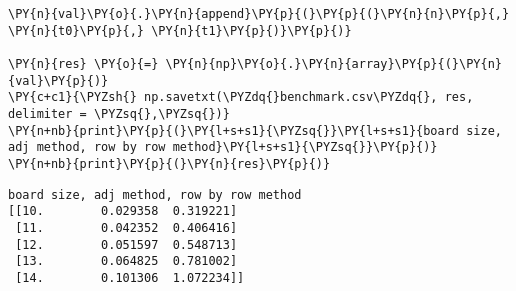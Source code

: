 \begin{english}
\begin{tcolorbox}[breakable, size=fbox, boxrule=1pt, pad at break*=1mm,colback=cellbackground, colframe=cellborder]
\begin{Verbatim}[commandchars=\\\{\}]
    \PY{n}{val}\PY{o}{.}\PY{n}{append}\PY{p}{(}\PY{p}{(}\PY{n}{n}\PY{p}{,} \PY{n}{t0}\PY{p}{,} \PY{n}{t1}\PY{p}{)}\PY{p}{)}

\PY{n}{res} \PY{o}{=} \PY{n}{np}\PY{o}{.}\PY{n}{array}\PY{p}{(}\PY{n}{val}\PY{p}{)}
\PY{c+c1}{\PYZsh{} np.savetxt(\PYZdq{}benchmark.csv\PYZdq{}, res, delimiter = \PYZsq{},\PYZsq{})}
\PY{n+nb}{print}\PY{p}{(}\PY{l+s+s1}{\PYZsq{}}\PY{l+s+s1}{board size, adj method, row by row method}\PY{l+s+s1}{\PYZsq{}}\PY{p}{)}
\PY{n+nb}{print}\PY{p}{(}\PY{n}{res}\PY{p}{)}
\end{Verbatim}
\end{tcolorbox}

    \begin{Verbatim}[commandchars=\\\{\}]
board size, adj method, row by row method
[[10.        0.029358  0.319221]
 [11.        0.042352  0.406416]
 [12.        0.051597  0.548713]
 [13.        0.064825  0.781002]
 [14.        0.101306  1.072234]]
    \end{Verbatim}     
\end{english}

